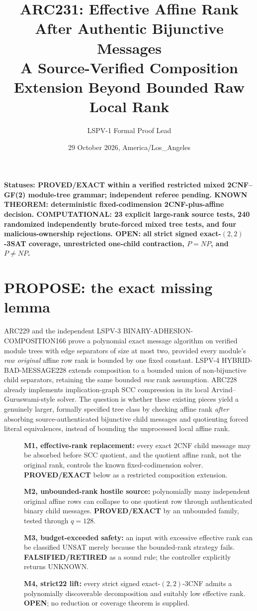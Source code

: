 \documentclass[11pt]{article}
\title{ARC231: Effective Affine Rank After Authentic Bijunctive Messages\\[3pt]\large A Source-Verified Composition Extension Beyond Bounded Raw Local Rank}
\author{LSPV-1 Formal Proof Lead}
\date{29 October 2026, America/Los\_Angeles}
\begin{document}
\maketitle
\noindent\textbf{Statuses: PROVED/EXACT within a verified restricted mixed 2CNF--GF(2) module-tree grammar; independent referee pending. KNOWN THEOREM: deterministic fixed-codimension 2CNF-plus-affine decision. COMPUTATIONAL: 23 explicit large-rank source tests, 240 randomized independently brute-forced mixed tree tests, and four malicious-ownership rejections. OPEN: all strict signed exact-$(2,2)$-3SAT coverage, unrestricted one-child contraction, $P=NP$, and $P\neq NP$.}

\section{PROPOSE: the exact missing lemma}
ARC229 and the independent LSPV-3 BINARY-ADHESION-COMPOSITION166 prove a polynomial exact message algorithm on verified module trees with edge separators of size at most two, provided every module's \emph{raw original} affine row rank is bounded by one fixed constant. LSPV-4 HYBRID-BAD-MESSAGE228 extends composition to a bounded union of non-bijunctive child separators, retaining the same bounded \emph{raw} rank assumption. ARC228 already implements implication-graph SCC compression in its local Arvind--Guruswami-style solver. The question is whether these existing pieces yield a genuinely larger, formally specified tree class by checking affine rank \emph{after} absorbing source-authenticated bijunctive child messages and quotienting forced literal equivalences, instead of bounding the unprocessed local affine rank.

\begin{description}
\item[] \textbf{M1, effective-rank replacement:} every exact 2CNF child message may be absorbed before SCC quotient, and the quotient affine rank, not the original rank, controls the known fixed-codimension solver. \textbf{PROVED/EXACT} below as a restricted composition extension.
\item[] \textbf{M2, unbounded-rank hostile source:} polynomially many independent original affine rows can collapse to one quotient row through authenticated binary child messages. \textbf{PROVED/EXACT} by an unbounded family, tested through $q=128$.
\item[] \textbf{M3, budget-exceeded safety:} an input with excessive effective rank can be classified UNSAT merely because the bounded-rank strategy fails. \textbf{FALSIFIED/RETIRED} as a sound rule; the controller explicitly returns UNKNOWN.
\item[] \textbf{M4, strict22 lift:} every strict signed exact-$(2,2)$-3CNF admits a polynomially discoverable decomposition and suitably low effective rank. \textbf{OPEN}; no reduction or coverage theorem is supplied.
\end{description}
\end{document}
